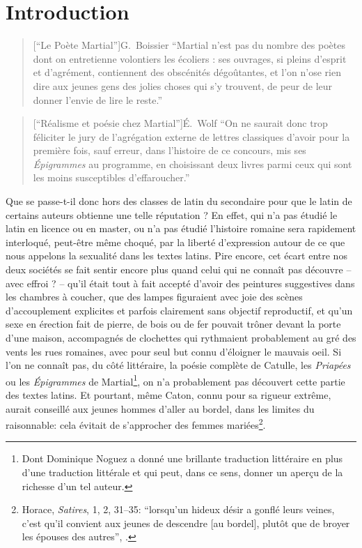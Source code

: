 \chapter*{Introduction}
\label{intro}

\begin{quote}[\enquote{Le Poète Martial}]{G.~Boissier}
    \enquote{Martial n’est pas du nombre des poètes dont on entretienne volontiers les écoliers : ses ouvrages, si pleins d’esprit et d’agrément, contiennent des obscénités dégoûtantes, et l’on n’ose rien dire aux jeunes gens des jolies choses qui s’y trouvent, de peur de leur donner l’envie de lire le reste.\textcite{boissier_poete_1900}}
\end{quote}

\begin{quote}[\enquote{Réalisme et poésie chez Martial}]{É.~Wolf}
    \enquote{On ne saurait donc trop féliciter le jury de l'agrégation externe de lettres classiques d'avoir pour la première fois, sauf erreur, dans l'histoire de ce concours, mis ses \textit{Épigrammes} au programme, en choisissant deux livres parmi ceux qui sont les moins susceptibles d'effaroucher.\textcite{wolff_realisme_1997}}
\end{quote}

Que se passe-t-il donc hors des classes de latin du secondaire pour que le latin de certains auteurs obtienne une telle réputation ? En effet, qui n'a pas étudié le latin en licence ou en master, ou n'a pas étudié l'histoire romaine sera rapidement interloqué, peut-être même choqué, par la liberté d'expression autour de ce que nous appelons la sexualité dans les textes latins. Pire encore, cet écart entre nos deux sociétés se fait sentir encore plus quand celui qui ne connaît pas découvre -- avec effroi ? -- qu'il était tout à fait accepté d'avoir des peintures suggestives dans les chambres à coucher, que des lampes figuraient avec joie des scènes d'accouplement explicites et parfois clairement sans objectif reproductif, et qu'un sexe en érection fait de pierre, de bois ou de fer pouvait trôner devant la porte d'une maison, accompagnés de clochettes qui rythmaient probablement au gré des vents les rues romaines, avec pour seul but connu d'éloigner le mauvais oeil. Si l'on ne connaît pas, du côté littéraire, la poésie complète de Catulle, les \textit{Priapées} ou les \textit{Épigrammes} de Martial\footnote{Dont Dominique Noguez a donné une brillante traduction littéraire en plus d'une traduction littérale et qui peut, dans ce sens, donner un aperçu de la richesse d'un tel auteur.}, on n'a probablement pas découvert cette partie des textes latins. Et pourtant, même Caton, connu pour sa rigueur extrême, aurait conseillé aux jeunes hommes d'aller au bordel, dans les limites du raisonnable: cela évitait de s'approcher des femmes mariées\footnote{Horace, \textit{Satires}, 1, 2, 31--35: \enquote{lorsqu'un hideux désir a gonflé leurs veines, c'est qu'il convient aux jeunes de descendre [au bordel], plutôt que de broyer les épouses des autres}, \textcite[p.~30]{puccini_delbey_vie_2010}.}.

